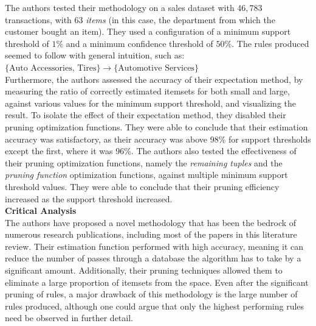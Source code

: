 \documentclass[paper=a4,fontsize=11pt]{report}	%
\begin{document}
The authors tested their methodology on a sales dataset with $46,783$ transactions,  with $63$ \textit{items} (in this case, the department from which the customer bought an item). They used a configuration of a minimum support threshold of $1\%$ and a minimum confidence threshold of $50\%$. The rules produced seemed to follow with general intuition, such as:\\
$\{\text{Auto Accessories, Tires}\} \rightarrow \{\text{Automotive Services}\} $\\
Furthermore, the authors assessed the accuracy of their expectation method, by measuring the ratio of correctly estimated itemsets for both small and large, against various values for the minimum support threshold, and visualizing the result. To isolate the effect of their expectation method, they disabled their pruning optimization functions. They were able to conclude that their estimation accuracy was satisfactory, as their accuracy was above 98\% for support thresholds except the first, where it was 96\%.  The authors also tested the effectiveness of their pruning optimization functions, namely the \textit{remaining tuples} and the \textit{pruning function} optimization functions, against multiple minimum support threshold values. They were able to conclude that their pruning efficiency increased as the support threshold increased.
\\\textbf{Critical Analysis}\\
The authors have proposed a novel methodology that has been the bedrock of numerous research publications,  including most of the papers in this literature review.  Their estimation function performed with high accuracy, meaning it can reduce the number of passes through a database the algorithm has to take by a significant amount. Additionally, their pruning techniques allowed them to eliminate a large proportion of itemsets from the space. Even after the significant pruning of rules, a major drawback of this methodology is the large number of rules produced, although one could argue that only the highest performing rules need be observed in further detail.
\end{document}
